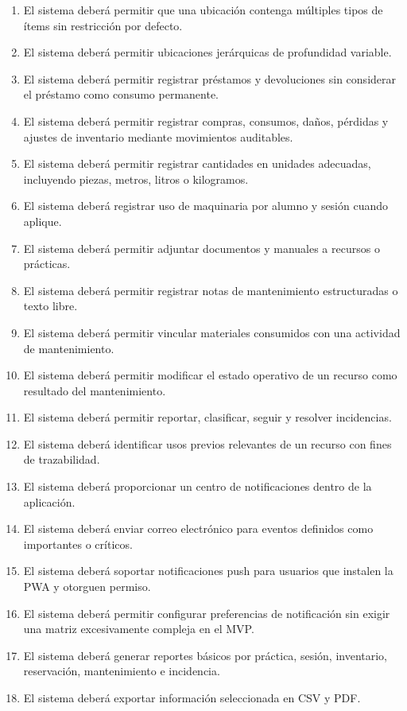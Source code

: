 \documentclass[12pt]{article}
\begin{document}
\begin{enumerate}[label=RF\arabic*., leftmargin=1.3cm]
    \item El sistema deberá permitir que una ubicación contenga múltiples tipos de ítems sin restricción por defecto.
    \item El sistema deberá permitir ubicaciones jerárquicas de profundidad variable.
    \item El sistema deberá permitir registrar préstamos y devoluciones sin considerar el préstamo como consumo permanente.
    \item El sistema deberá permitir registrar compras, consumos, daños, pérdidas y ajustes de inventario mediante movimientos auditables.
    \item El sistema deberá permitir registrar cantidades en unidades adecuadas, incluyendo piezas, metros, litros o kilogramos.
    \item El sistema deberá registrar uso de maquinaria por alumno y sesión cuando aplique.
    \item El sistema deberá permitir adjuntar documentos y manuales a recursos o prácticas.
    \item El sistema deberá permitir registrar notas de mantenimiento estructuradas o texto libre.
    \item El sistema deberá permitir vincular materiales consumidos con una actividad de mantenimiento.
    \item El sistema deberá permitir modificar el estado operativo de un recurso como resultado del mantenimiento.
    \item El sistema deberá permitir reportar, clasificar, seguir y resolver incidencias.
    \item El sistema deberá identificar usos previos relevantes de un recurso con fines de trazabilidad.
    \item El sistema deberá proporcionar un centro de notificaciones dentro de la aplicación.
    \item El sistema deberá enviar correo electrónico para eventos definidos como importantes o críticos.
    \item El sistema deberá soportar notificaciones push para usuarios que instalen la PWA y otorguen permiso.
    \item El sistema deberá permitir configurar preferencias de notificación sin exigir una matriz excesivamente compleja en el MVP.
    \item El sistema deberá generar reportes básicos por práctica, sesión, inventario, reservación, mantenimiento e incidencia.
    \item El sistema deberá exportar información seleccionada en CSV y PDF.

\end{enumerate}
\end{document}
